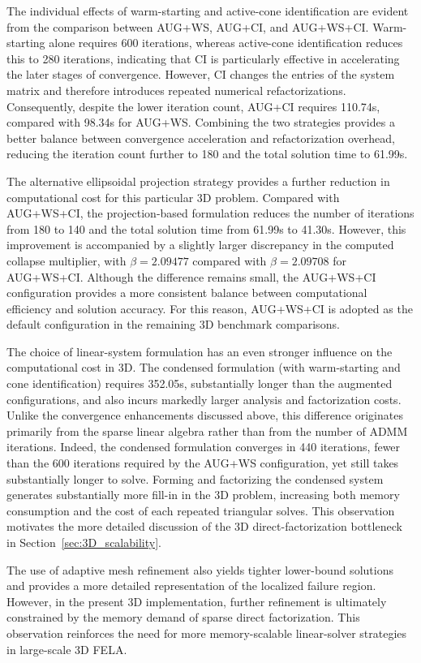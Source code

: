 The individual effects of warm-starting and active-cone identification are evident from the comparison between AUG+WS, AUG+CI, and AUG+WS+CI. Warm-starting alone requires 600 iterations, whereas active-cone identification reduces this to 280 iterations, indicating that CI is particularly effective in accelerating the later stages of convergence. However, CI changes the entries of the system matrix and therefore introduces repeated numerical refactorizations. Consequently, despite the lower iteration count, AUG+CI requires 110.74s, compared with 98.34s for AUG+WS. Combining the two strategies provides a better balance between convergence acceleration and refactorization overhead, reducing the iteration count further to 180 and the total solution time to 61.99s.

The alternative ellipsoidal projection strategy provides a further reduction in computational cost for this particular 3D problem. Compared with AUG+WS+CI, the projection-based formulation reduces the number of iterations from 180 to 140 and the total solution time from 61.99s to 41.30s. However, this improvement is accompanied by a slightly larger discrepancy in the computed collapse multiplier, with $\beta=2.09477$ compared with $\beta=2.09708$ for AUG+WS+CI. Although the difference remains small, the AUG+WS+CI configuration provides a more consistent balance between computational efficiency and solution accuracy. For this reason, AUG+WS+CI is adopted as the default configuration in the remaining 3D benchmark comparisons.

The choice of linear-system formulation has an even stronger influence on the computational cost in 3D. The condensed formulation (with warm-starting and cone identification) requires 352.05s, substantially longer than the augmented configurations, and also incurs markedly larger analysis and factorization costs. Unlike the convergence enhancements discussed above, this difference originates primarily from the sparse linear algebra rather than from the number of ADMM iterations. Indeed, the condensed formulation converges in 440 iterations, fewer than the 600 iterations required by the AUG+WS configuration, yet still takes substantially longer to solve. Forming and factorizing the condensed system generates substantially more fill-in in the 3D problem, increasing both memory consumption and the cost of each repeated triangular solves. This observation motivates the more detailed discussion of the 3D direct-factorization bottleneck in Section~\ref{sec:3D_scalability}.

The use of adaptive mesh refinement also yields tighter lower-bound solutions and provides a more detailed representation of the localized failure region. However, in the present 3D implementation, further refinement is ultimately constrained by the memory demand of sparse direct factorization. This observation reinforces the need for more memory-scalable linear-solver strategies in large-scale 3D FELA.
